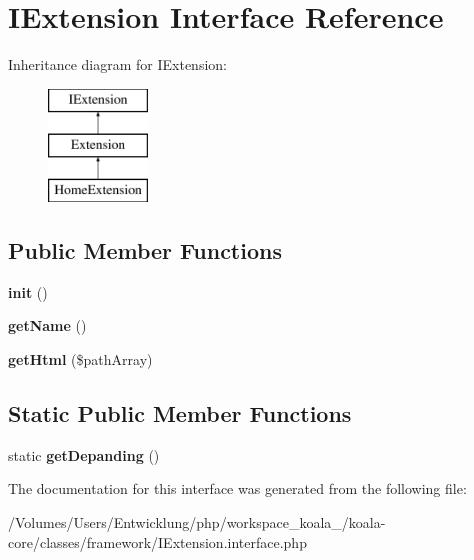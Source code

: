 \hypertarget{interface_i_extension}{
\section{IExtension Interface Reference}
\label{interface_i_extension}
}
Inheritance diagram for IExtension:\begin{figure}[H]
\begin{center}
\leavevmode
\includegraphics[height=3.000000cm]{interface_i_extension}
\end{center}
\end{figure}
\subsection*{Public Member Functions}
\begin{DoxyCompactItemize}
\item 
\hypertarget{interface_i_extension_a6b65401023ede90417e24b8ad3789341}{
{\bfseries init} ()}
\label{interface_i_extension_a6b65401023ede90417e24b8ad3789341}

\item 
\hypertarget{interface_i_extension_a6e7d9d8660ef0514c29dd7fe02cada06}{
{\bfseries getName} ()}
\label{interface_i_extension_a6e7d9d8660ef0514c29dd7fe02cada06}

\item 
\hypertarget{interface_i_extension_a7ae8d3c300ab59feca8cd86228e01fa8}{
{\bfseries getHtml} (\$pathArray)}
\label{interface_i_extension_a7ae8d3c300ab59feca8cd86228e01fa8}

\end{DoxyCompactItemize}
\subsection*{Static Public Member Functions}
\begin{DoxyCompactItemize}
\item 
\hypertarget{interface_i_extension_a453d01086e13a1137fca25c397a5f922}{
static {\bfseries getDepanding} ()}
\label{interface_i_extension_a453d01086e13a1137fca25c397a5f922}

\end{DoxyCompactItemize}


The documentation for this interface was generated from the following file:\begin{DoxyCompactItemize}
\item 
/Volumes/Users/Entwicklung/php/workspace\_\-koala\_/koala-\/core/classes/framework/IExtension.interface.php\end{DoxyCompactItemize}
